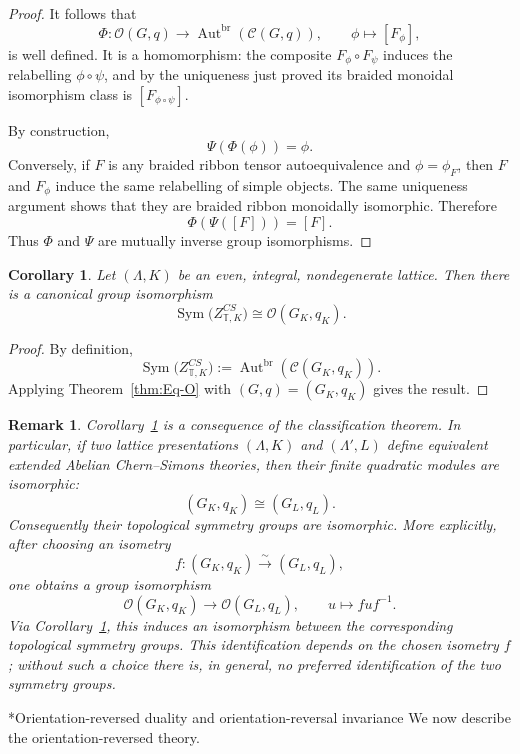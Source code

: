 \documentclass[12pt]{amsart}
\makeatletter
\renewcommand\subsection{\@startsection{subsection}{2}%
  \z@{.5\linespacing\@plus.7\linespacing}{-.5em}%
  {\normalfont\bfseries}}
\numberwithin{equation}{section}
\newtheorem{corollary}[theorem]{Corollary}
\newtheorem*{remark}{Remark}
\theoremstyle{definition}
\DeclareMathOperator{\Sym}{Sym}
\makeatother
\begin{document}
\begin{proof}
It follows that
$$
\Phi:
\mathcal O(G,q)
\longrightarrow
\operatorname{Aut}^{\mathrm{br}}(\mathcal C(G,q)),
\qquad
\phi\longmapsto[F_\phi],
$$
is well defined. It is a homomorphism: the composite $F_\phi\circ F_\psi$ induces the relabelling $\phi\circ\psi$, and by the uniqueness just proved its braided monoidal isomorphism class is $[F_{\phi\circ\psi}]$.

By construction,
$$
\Psi(\Phi(\phi))=\phi.
$$
Conversely, if $F$ is any braided ribbon tensor autoequivalence and $\phi=\phi_F$, then $F$ and $F_\phi$ induce the same relabelling of simple objects. The same uniqueness argument shows that they are braided ribbon monoidally isomorphic. Therefore
$$
\Phi(\Psi([F]))=[F].
$$
Thus $\Phi$ and $\Psi$ are mutually inverse group isomorphisms.
\end{proof}

\begin{corollary}
\label{cor:symmetry-group}
Let $(\Lambda,K)$ be an even, integral, nondegenerate lattice.  Then there is a canonical group isomorphism
$$
\Sym\!\bigl(Z^{CS}_{\mathbb T,K}\bigr)\cong \mathcal O(G_K,q_K)  .
$$
\end{corollary}

\begin{proof}
By definition,
$$
\Sym\!\bigl(Z^{CS}_{\mathbb T,K}\bigr)
:=
\operatorname{Aut}^{\mathrm{br}}(\mathcal C(G_K,q_K)).
$$
Applying Theorem~\ref{thm:Eq-O} with $(G,q)=(G_K,q_K)$ gives the result.
\end{proof}

\begin{remark}
Corollary~\ref{cor:symmetry-group} is a consequence of the classification theorem. In particular, if two lattice presentations $(\Lambda,K)$ and $(\Lambda',L)$ define equivalent extended Abelian Chern--Simons theories, then their finite quadratic modules are isomorphic:
$$
(G_K,q_K)\cong (G_L,q_L).
$$
Consequently their topological symmetry groups are isomorphic. More explicitly, after choosing an isometry
$$
f:(G_K,q_K)\xrightarrow{\sim}(G_L,q_L),
$$
one obtains a group isomorphism
$$
\mathcal O(G_K,q_K)  
\longrightarrow
\mathcal O(G_L,q_L),
\qquad
u\longmapsto fuf^{-1}.
$$
Via Corollary~\ref{cor:symmetry-group}, this induces an isomorphism between the corresponding topological symmetry groups. This identification depends on the chosen isometry $f$; without such a choice there is, in general, no preferred identification of the two symmetry groups.
\end{remark}


\subsection*{Orientation-reversed duality and orientation-reversal invariance}
We now describe the orientation-reversed theory.
\end{document}
